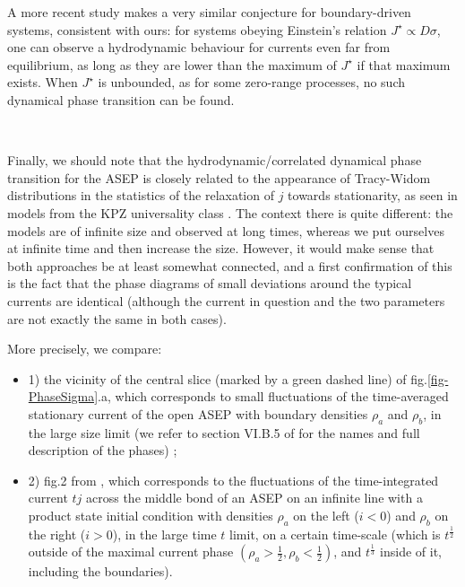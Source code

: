 \documentclass[aps,pre,onecolumn,showpacs,showkeys,a4paper]{revtex4-1}
\begin{document}
A more recent study \cite{Baek2016} makes a very similar conjecture for boundary-driven systems, consistent with ours: for systems obeying Einstein's relation $J^\star\propto D\sigma$, one can observe a hydrodynamic behaviour for currents even far from equilibrium, as long as they are lower than the maximum of $J^\star$ if that maximum exists. When $J^\star$ is unbounded, as for some zero-range processes, no such dynamical phase transition can be found.

~

Finally, we should note that the hydrodynamic/correlated dynamical phase transition for the ASEP is closely related to the appearance of Tracy-Widom distributions in the statistics of the relaxation of $j$ towards stationarity, as seen in models from the KPZ universality class \cite{Spohn2016,Corwin2016}. The context there is quite different: the models are of infinite size and observed at long times, whereas we put ourselves at infinite time and then increase the size. However, it would make sense that both approaches be at least somewhat connected, and a first confirmation of this is the fact that the phase diagrams of small deviations around the typical currents are identical (although the current in question and the two parameters are not exactly the same in both cases).

More precisely, we compare:
\begin{itemize}
\item 1) the vicinity of the central slice (marked by a green dashed line) of fig.\ref{fig-PhaseSigma}.a, which corresponds to small fluctuations of the time-averaged stationary current of the open ASEP with boundary densities $\rho_a$ and $\rho_b$, in the large size limit (we refer to section VI.B.5 of \cite{Lazarescu2015} for the names and full description of the phases) ;
\item 2) fig.2 from \cite{BenArous2011}, which corresponds to the fluctuations of the time-integrated current $tj$ across the middle bond of an ASEP on an infinite line with a product state initial condition with densities $\rho_a$ on the left ($i<0$) and $\rho_b$ on the right ($i>0$), in the large time $t$ limit, on a certain time-scale (which is $t^{\frac{1}{2}}$ outside of the maximal current phase $(\rho_a>\frac{1}{2},\rho_b<\frac{1}{2})$, and $t^{\frac{1}{3}}$ inside of it, including the boundaries).
\end{itemize}
\end{document}
